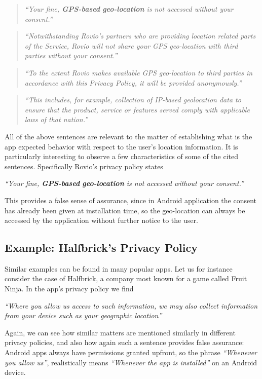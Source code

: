 \begin{quote}
\emph{``Your fine, \textbf{GPS-based} \textbf{geo-location} is not accessed without your consent.''}
\end{quote}

\begin{quote}
\emph{``Notwithstanding Rovio's partners who are providing location related parts of the Service, Rovio will not share your GPS geo-location with third parties without your consent.''}
\end{quote}

\begin{quote}
\emph{``To the extent Rovio makes available GPS geo-location to third parties in accordance with this Privacy Policy, it will be provided anonymously.''}
\end{quote}

\begin{quote}
\emph{``This includes, for example, collection of IP-based geolocation data to ensure that the product, service or features served comply with applicable laws of that nation.''}
\end{quote}

All of the above sentences are relevant to the matter of establishing what is the app expected behavior with respect to the user's location information. It is particularly interesting to observe a few characteristics of some of the cited sentences. Specifically Rovio's privacy policy states

\emph{``Your fine, \textbf{GPS-based} \textbf{geo-location} is not accessed without your consent.''}

This provides a false sense of assurance, since in Android application the consent has already been given at installation time, so the geo-location can always be accessed by the application without further notice to the user.

\subsection{Example: Halfbrick's Privacy Policy}
Similar examples can be found in many popular apps. Let us for instance consider the case of Halfbrick, a company most known for a game called Fruit Ninja. In the app's privacy policy we find

\emph{``Where you allow us access to such information, we may also collect information from your device such as your geographic location''}\cite{halfbrick}

Again, we can see how similar matters are mentioned similarly in different privacy policies, and also how again such a sentence provides false assurance: Android apps always have permissions granted upfront, so the phrase \emph{``Whenever you allow us''}, realistically means \emph{``Whenever the app is installed''} on an Android device.

